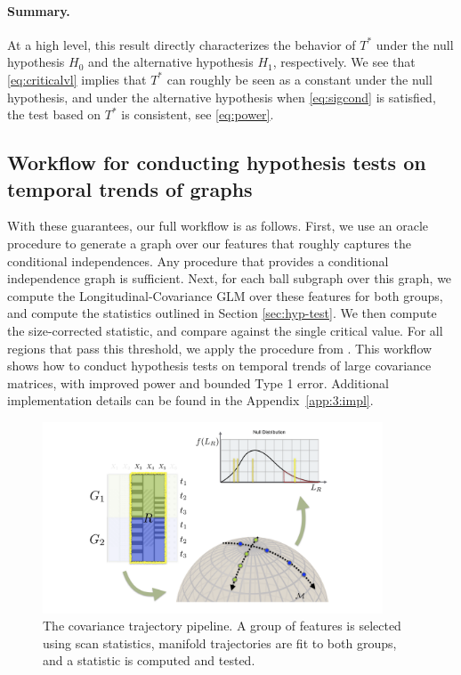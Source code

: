 \paragraph{Summary.} At a high level, this result directly characterizes the behavior of $T^*$ under the null hypothesis $H_0$ and 
the alternative hypothesis $H_1$, respectively. 
We see that \eqref{eq:criticalvl} implies that $T^*$ can roughly be seen as a constant under the null hypothesis, 
and under the alternative hypothesis when \eqref{eq:sigcond} is satisfied, the test based on $T^*$ is consistent, see \eqref{eq:power}. 

\subsection{Workflow for conducting hypothesis tests on temporal trends of graphs}
With these guarantees, our full workflow is as follows. First, we use an oracle procedure to generate a graph over our features 
that roughly captures the conditional independences. Any procedure that provides a conditional independence graph is sufficient. 
Next, for each ball subgraph over this graph, we compute the Longitudinal-Covariance GLM over these features for both groups, and compute the statistics outlined in Section \ref{sec:hyp-test}. We then compute the size-corrected statistic, and compare against the single critical value. For all regions that pass this threshold, we apply the procedure from \cite{jeng2010optimal}. This workflow shows how to conduct hypothesis tests on temporal trends of large covariance matrices, with improved 
power and bounded Type 1 error. Additional implementation details can be found in the Appendix~\ref{app:3:impl}.
\begin{figure}
	\centering
	\includegraphics[width=0.9\textwidth,trim={5cm 0 4cm 0}, clip]{3_covtraj/figs/pipeline_fig/pipeline_fig.001.png}
	\caption[The covariance trajectory pipeline]{The covariance trajectory pipeline. A group of features is selected using scan statistics, manifold trajectories are fit to both groups, and a statistic is computed and tested.}
\end{figure}